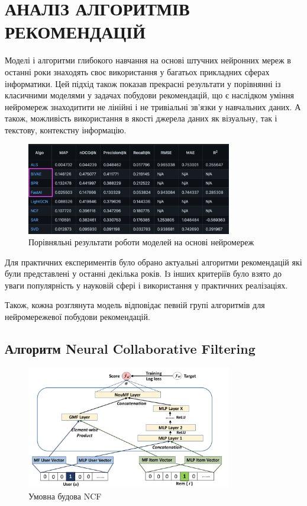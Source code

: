 \section{АНАЛІЗ АЛГОРИТМІВ РЕКОМЕНДАЦІЙ}
Моделі і алгоритми глибокого навчання на основі штучних нейронних мереж в останні роки знаходять своє використання у багатьох прикладних сферах інформатики. Цей підхід також показав прекрасні результати у порівнянні із класичними моделями у задачах побудови рекомендацій, що є наслідком уміння нейромереж знаходитити не лінійні і не тривіальні зв’язки у навчальних даних. А також, можливість використання в якості джерела даних як візуальну, так і текстову, контекстну інформацію.

\begin{figure}[H]
    \centering
    \includegraphics[width=0.8\textwidth]{images/NN_model_res.png}
    \caption{Порівняльні результати роботи моделей на основі нейромереж}
\end{figure}


Для практичних експериментів було обрано актуальні алгоритми рекомендацій які були представлені у останні декілька років. Із інших критеріїв було взято до уваги популярність у науковій сфері і використання у практичних реалізаціях.

Також, кожна розглянута модель відповідає певній групі алгоритмів для нейромережевої побудови рекомендацій.

\subsection{Алгоритм Neural Collaborative Filtering}

\begin{figure}
    \centering
    \includegraphics[width=0.8\textwidth]{images/NCF.png}
    \caption{Умовна будова NCF}
\end{figure}

